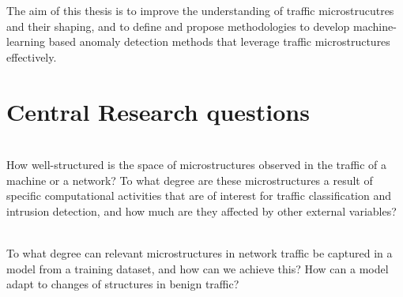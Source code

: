 The aim of this thesis is to improve the understanding of traffic microstrucutres and their shaping, and to define and propose methodologies to develop machine-learning based anomaly detection methods that leverage traffic microstructures effectively.



\section{Central Research questions}\label{Sec:Reseach_questions}

\begin{rquestion}\ \\ 
How well-structured is the space of microstructures observed in the traffic of a machine or a network? To what degree are these microstructures a result of specific computational activities that are of interest for traffic classification and intrusion detection, and how much are they affected by other external variables?

\end{rquestion}



\begin{rquestion}\ \\
To what degree can relevant microstructures in network traffic be captured in a model from a training dataset, and how can we achieve this? How can a model adapt to changes of structures in benign traffic?
\end{rquestion}

